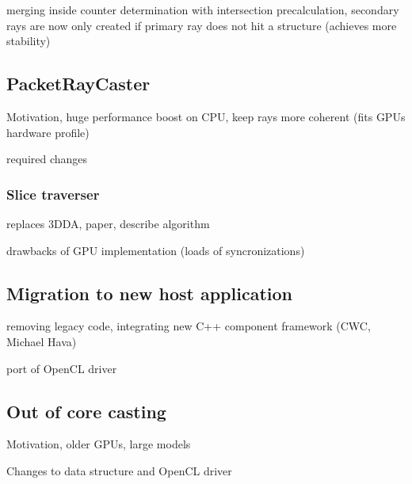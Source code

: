 merging inside counter determination with intersection precalculation, secondary rays are now only created if primary ray does not hit a structure (achieves more stability)

\subsection{PacketRayCaster}

Motivation, huge performance boost on CPU, keep rays more coherent (fits GPUs hardware profile)

required changes

\subsubsection{Slice traverser}

replaces 3DDA, paper, describe algorithm

drawbacks of GPU implementation (loads of syncronizations)

\subsection{Migration to new host application}
\label{sec:migration}

removing legacy code, integrating new C++ component framework (CWC, Michael Hava)

port of OpenCL driver

\subsection{Out of core casting}

Motivation, older GPUs, large models

Changes to data structure and OpenCL driver

